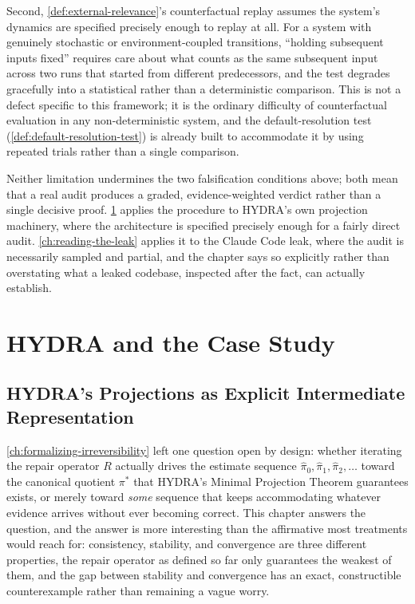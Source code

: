 \documentclass[11pt]{book}
\theoremstyle{plain}
\theoremstyle{definition}
\theoremstyle{remark}
\begin{document}
Second, \cref{def:external-relevance}'s counterfactual replay assumes
the system's dynamics are specified precisely enough to replay at all.
For a system with genuinely stochastic or environment-coupled
transitions, \enquote{holding subsequent inputs fixed} requires care
about what counts as the same subsequent input across two runs that
started from different predecessors, and the test degrades gracefully
into a statistical rather than a deterministic comparison. This is not
a defect specific to this framework; it is the ordinary difficulty of
counterfactual evaluation in any non-deterministic system, and the
default-resolution test (\cref{def:default-resolution-test}) is
already built to accommodate it by using repeated trials rather than a
single comparison.

Neither limitation undermines the two falsification conditions above;
both mean that a real audit produces a graded, evidence-weighted
verdict rather than a single decisive proof. \cref{ch:hydra-projections}
applies the procedure to HYDRA's own projection machinery, where the
architecture is specified precisely enough for a fairly direct audit.
\cref{ch:reading-the-leak} applies it to the Claude Code leak, where
the audit is necessarily sampled and partial, and the chapter says so
explicitly rather than overstating what a leaked codebase, inspected
after the fact, can actually establish.

\part{HYDRA and the Case Study}
\chapter{HYDRA's Projections as Explicit Intermediate Representation}
\label{ch:hydra-projections}

\cref{ch:formalizing-irreversibility} left one question open by
design: whether iterating the repair operator $R$ actually drives the
estimate sequence $\hat\pi_0, \hat\pi_1, \hat\pi_2, \dots$ toward the
canonical quotient $\pi^*$ that HYDRA's Minimal Projection Theorem
guarantees exists, or merely toward \emph{some} sequence that keeps
accommodating whatever evidence arrives without ever becoming correct.
This chapter answers the question, and the answer is more interesting
than the affirmative most treatments would reach for: consistency,
stability, and convergence are three different properties, the repair
operator as defined so far only guarantees the weakest of them, and
the gap between stability and convergence has an exact, constructible
counterexample rather than remaining a vague worry.
\end{document}
